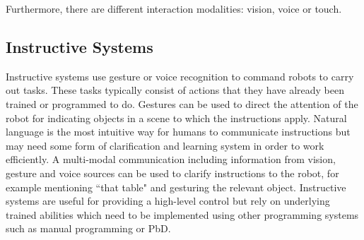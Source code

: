 Furthermore, there are different interaction modalities: vision, voice or touch.

\subsection{Instructive Systems}%
Instructive systems use gesture or voice recognition to command robots to carry out tasks.
These tasks typically consist of actions that they have already been trained or programmed to do. 
Gestures can be used to direct the attention of the robot for indicating objects in a scene to which the instructions apply. 
Natural language is the most intuitive way for humans to communicate instructions but may need some form of clarification and learning system in order to work efficiently. 
A multi-modal communication including information from vision, gesture and voice sources can be used to clarify instructions to the robot, for example mentioning ``that table" and gesturing the relevant object.
Instructive systems are useful for providing a high-level control but rely on underlying trained abilities which need to be implemented using other programming systems such as manual programming or PbD.

